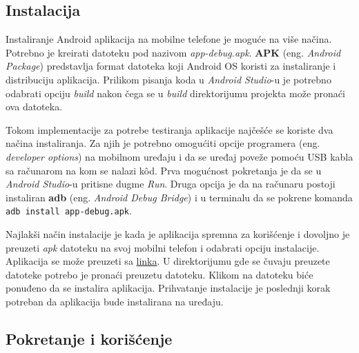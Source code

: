 \documentclass[implementacija.tex]{subfiles}
\begin{document}
\subsection{Instalacija}
Instaliranje Android aplikacija na mobilne telefone je moguće na više načina. Potrebno je kreirati datoteku pod nazivom \textit{app-debug.apk}. \textbf{APK} (eng. \textit{Android Package}) predstavlja format datoteka koji Android OS koristi za instaliranje i distribuciju aplikacija. Prilikom pisanja koda u \textit{Android Studio}-u je potrebno odabrati opciju \textit{build} nakon čega se u \textit{build} direktorijumu projekta može pronaći ova datoteka.

Tokom implementacije za potrebe testiranja aplikacije najčešće se koriste dva načina instaliranja. Za njih je potrebno omogućiti opcije programera (eng. \textit{developer options}) na mobilnom uređaju i da se uređaj poveže pomoću USB kabla sa računarom na kom se nalazi k\^{o}d. Prva mogućnost pokretanja je da se u \textit{Android Studio}-u pritisne dugme \textit{Run}. Druga opcija je da na računaru postoji instaliran \textbf{adb} (eng. \textit{Android Debug Bridge}) i u terminalu da se pokrene komanda \verb|adb install app-debug.apk|. 

Najlakši način instalacije je kada je aplikacija spremna za korišćenje i dovoljno je preuzeti \textit{apk} datoteku na svoj mobilni telefon i odabrati opciju instalacije. Aplikacija se može preuzeti sa \hyperlink{https://drive.google.com/file/d/1gBlfRibn4jrFDe3TTBCsHUq9MDowEBty/view?usp=share_link}{linka}. U direktorijumu gde se čuvaju preuzete datoteke potrebo je pronaći preuzetu datoteku. Klikom na datoteku biće ponuđeno da se instalira aplikacija. Prihvatanje instalacije je poslednji korak potreban da aplikacija bude instalirana na uređaju.

\subsection{Pokretanje i korišćenje}
\end{document}
